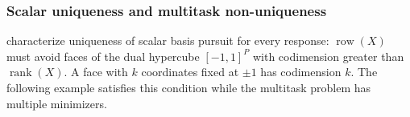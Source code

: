 % 
% 
% 

\subsubsection{Scalar uniqueness and multitask non-uniqueness}
\label{sec:rotation_nonuniqueness}

\citet[Theorem~2]{JMLR:v23:21-0420} characterize uniqueness of scalar basis pursuit for every response: $\operatorname{row}(X)$ must avoid faces of the dual hypercube $[-1,1]^P$ with codimension greater than $\operatorname{rank}(X)$.
A face with $k$ coordinates fixed at $\pm1$ has codimension $k$.
The following example satisfies this condition while the multitask problem has multiple minimizers.

